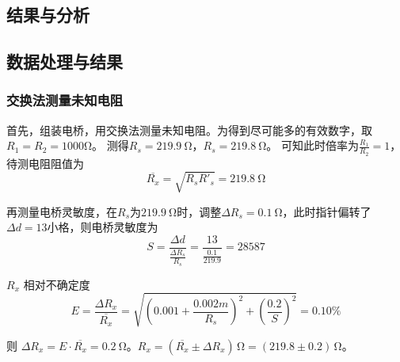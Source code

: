 \documentclass[]{../template/Report}%
\begin{document}
\begin{fullreportonly}
    \section{结果与分析}
    \subsection{数据处理与结果}
    \subsubsection{交换法测量未知电阻}
    首先，组装电桥，用交换法测量未知电阻。为得到尽可能多的有效数字，取$R_1=R_2 = 1000 \si{\ohm}$。
    测得$R_s = \SI{219.9}{\ohm}，R_s = \SI{219.8}{\ohm}$。
    可知此时倍率为$\frac{R_1}{R_2} = 1 $，待测电阻阻值为
    \[\overline{R_x} = \sqrt{R_s R'_s} = \SI{219.8}{\ohm}\]

    再测量电桥灵敏度，在$R_s$为$\SI{219.9}{\ohm}$时，调整$\Delta R_s = \SI{0.1}{\ohm}$，此时指针偏转了$\Delta d = 13$小格，则电桥灵敏度为
    \[S = \frac{\Delta d}{\frac{\Delta R_s}{R_s}} = \frac{13}{\frac{0.1}{219.9}} = 28587\]

    $R_x$ 相对不确定度
    \[E = \frac{\Delta R_x}{\overline{R_x}} = \sqrt{\left(0.001+ \frac{0.002m}{R_s}\right)^2 + \left(\frac{0.2}{S}\right)^2} = 0.10\% \]

    则 $\Delta R_x = E \cdot \overline{R_x} = \SI{0.2}{\ohm}$。$R_x = (\overline{R_x} \pm \Delta R_x)\,\si{\ohm} = (219.8 \pm 0.2)\,\si{\ohm}$。

\end{fullreportonly}
\end{document}
